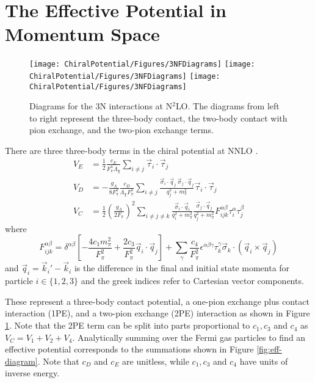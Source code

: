 \section{\label{sec:momentum}The Effective Potential in Momentum Space}

\begin{figure}
\centering
\texttt{[image: ChiralPotential/Figures/3NFDiagrams]}
\texttt{[image: ChiralPotential/Figures/3NFDiagrams]}
\texttt{[image: ChiralPotential/Figures/3NFDiagrams]}
\caption[Diagrams for the 3N interactions at N$^2$LO]{\label{fig:3NF}Diagrams for the 3N interactions at N$^2$LO. The diagrams from left to right represent the three-body contact, the two-body contact with pion exchange, and the two-pion exchange terms. }
\end{figure}

There are three three-body terms in the chiral potential at NNLO \cite{PhysRevC.66.064001}. 
\begin{align}
V_E&=\frac{1}{2}\frac{c_E }{F_\pi^4\Lambda_\chi}\sum_{i\neq j} \vec{\tau}_i\cdot\vec{\tau}_j \label{eq:V_E} \\
V_D&=-\frac{ g_A}{8F_\pi^2}\frac{c_D}{\Lambda_\chi F_\pi^2}\sum_{i\neq j } \frac{ \vec{\sigma}_i\cdot\vec{q}_j\:\vec{\sigma}_j\cdot\vec{q}_j }{q^2_j+m_\pi^2} \vec{\tau}_i\cdot\vec{\tau}_j \label{eq:V_D}\\
V_{C} &= \frac{1}{2}\left(\frac{g_A}{2F_\pi}\right)^2\sum_{i\neq j \neq k} \frac{ \vec{\sigma}_i\cdot\vec{q}_i}{q_i^2+m_\pi^2}\frac{\vec{\sigma}_j\cdot\vec{q}_j }{q^2_j+m_\pi^2} F_{ijk}^{\alpha\beta}\tau_i^{\alpha}\tau_j^\beta \label{eq:V_C}
\end{align}
%
where 
\begin{equation}
F_{ijk}^{\alpha\beta}=\delta^{\alpha \beta}\left[-\frac{4c_1m_\pi^2}{F_\pi^2}+\frac{2c_3}{F_\pi^2}\vec{q}_i\cdot\vec{q}_j\right]+\sum_\gamma\frac{c_4}{F_\pi^2}\epsilon^{\alpha\beta\gamma}\tau^\gamma_k\vec{\sigma}_k\cdot\left(\vec{q}_i\times\vec{q}_j\right)
\end{equation}
and $\vec{q}_i=\vec{k}_i' - \vec{k}_i$ is the difference in the final and initial state momenta for particle $i \in \{1,2,3\}$ and the greek indices refer to Cartesian vector components.

These represent a three-body contact potential, a one-pion exchange plus contact interaction (1PE), and a two-pion exchange (2PE) interaction as shown in Figure \ref{fig:3NF}. Note that the 2PE term can be split into parts proportional to $c_1, c_3$ and $c_4$ as $V_C=V_1+V_2+V_4$. Analytically summing over the Fermi gas particles to find an effective potential corresponds to the summations shown in Figure \ref{fig:eff-diagram}. Note that $c_D$ and $c_E$ are unitless, while $c_1, c_3$ and $c_4$ have units of inverse energy. 

